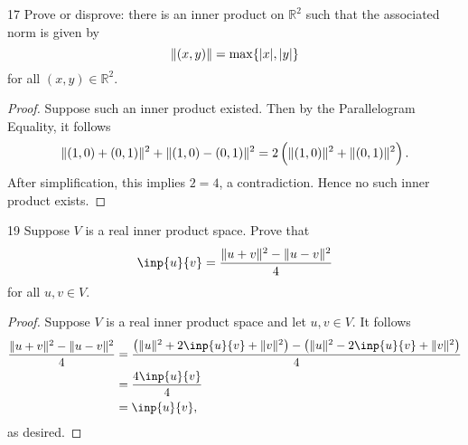 \documentclass{extarticle}
\newenvironment{problem}[1]{\begin{prob*}{#1}{}}{\end{prob*}}
\newcommand{\R}{\mathbb{R}}
\DeclarePairedDelimiter\Mod{\lvert}{\rvert}
\DeclarePairedDelimiter\Norm{\lVert}{\rVert}
\begin{document}
\begin{problem}{17}
Prove or disprove: there is an inner product on $\R^2$ such that the associated norm is given by 
\begin{equation*}
\Norm{(x,y)} = \max\{\Mod{x},\Mod{y}\}
\end{equation*}
for all $(x, y)\in\R^2$.
\end{problem}
\begin{proof}
Suppose such an inner product existed.  Then by the Parallelogram Equality, it follows
\begin{align*}
\Norm{(1, 0) + (0, 1)}^2 + \Norm{(1, 0) - (0, 1)}^2 = 2\left(\Norm{(1,0)}^2 + \Norm{(0,1)}^2\right).
\end{align*}
After simplification, this implies $2 = 4$, a contradiction.  Hence no such inner product exists.
\end{proof}

\begin{problem}{19}
Suppose $V$ is a real inner product space.  Prove that
\begin{equation*}
\inp{u}{v} = \frac{\Norm{u+v}^2 - \Norm{u - v}^2}{4}
\end{equation*}
for all $u,v\in V$.
\end{problem}
\begin{proof}
Suppose $V$ is a real inner product space and let $u,v\in V$.  It follows
\begin{align*}
\frac{\Norm{u+v}^2 - \Norm{u - v}^2}{4} &= \frac{\left(\Norm{u}^2 + 2\inp{u}{v} +\Norm{v}^2\right) - \left(\Norm{u}^2 - 2\inp{u}{v} +\Norm{v}^2\right)}{4}\\
&= \frac{4\inp{u}{v}}{4}\\
&= \inp{u}{v},
\end{align*}
as desired.
\end{proof}
\end{document}
